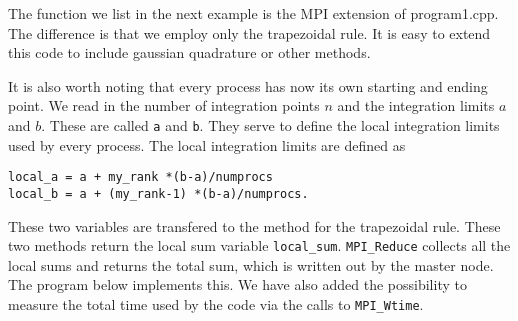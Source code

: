 The function we list in the next example is the MPI extension of program1.cpp.  The difference is that we employ only the trapezoidal
rule. It is easy to extend this code to include gaussian quadrature or other methods.

It is also worth noting that every process has now its own starting and ending point. 
We read in the number of integration points $n$ and the integration limits $a$ and $b$. These are called
\verb?a? and \verb?b?.
They serve to define the local integration limits used by every process. The local integration limits are
defined as 
\begin{lstlisting}
local_a = a + my_rank *(b-a)/numprocs
local_b = a + (my_rank-1) *(b-a)/numprocs.
\end{lstlisting}
These two variables are transfered to the method for the trapezoidal rule.  These two methods
return the local sum variable \lstinline{local_sum}. \lstinline{MPI_Reduce} collects all the local sums and returns the total sum,
which is written out by the master node.  The program below implements this.  We have also added the possibility to
measure the total time used by the code via the calls to \lstinline{MPI_Wtime}. 
\lstset{language=c++}
